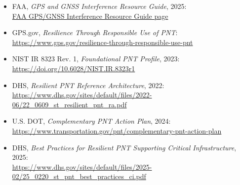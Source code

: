 \documentclass[11pt]{article}
\begin{document}
\begin{itemize}[leftmargin=*]
  \item FAA, \emph{GPS and GNSS Interference Resource Guide}, 2025:\\
    \href{https://www.faa.gov/about/office_org/headquarters_offices/avs/offices/afx/afs400/afs410/GNSS}{FAA GPS/GNSS Interference Resource Guide page}
  \item GPS.gov, \emph{Resilience Through Responsible Use of PNT}:\\
    \url{https://www.gps.gov/resilience-through-responsible-use-pnt}
  \item NIST IR 8323 Rev. 1, \emph{Foundational PNT Profile}, 2023:\\
    \url{https://doi.org/10.6028/NIST.IR.8323r1}
  \item DHS, \emph{Resilient PNT Reference Architecture}, 2022:\\
    \url{https://www.dhs.gov/sites/default/files/2022-06/22_0609_st_resilient_pnt_ra.pdf}
  \item U.S. DOT, \emph{Complementary PNT Action Plan}, 2024:\\
    \url{https://www.transportation.gov/pnt/complementary-pnt-action-plan}
  \item DHS, \emph{Best Practices for Resilient PNT Supporting Critical
    Infrastructure}, 2025:\\
    \url{https://www.dhs.gov/sites/default/files/2025-02/25_0220_st_pnt_best_practices_ci.pdf}
\end{itemize}
\end{document}
